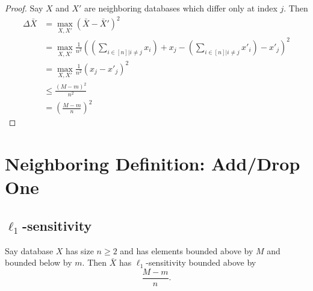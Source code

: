 \documentclass[11pt]{scrartcl} %
\begin{document}
\begin{proof}
	Say $X$ and $X'$ are neighboring databases which differ only at index $j$. Then
	\begin{align*}
		\Delta{\bar{X}} &= \max_{X,X'} (\bar{X} - \bar{X}')^2 \\
						&= \max_{X,X'} \frac{1}{n^2} \left(
								\left( \sum_{i \in [n] | i \neq j} x_i \right) + x_j -
								\left( \sum_{i \in [n] | i \neq j} x'_i \right) - x'_j
							\right)^2 \\
						&= \max_{X,X'} \frac{1}{n^2} (x_j - x'_j)^2 \\
						&\leq \frac{(M-m)^2}{n^2} \\
						&= \left( \frac{M-m}{n} \right)^2
	\end{align*}
\end{proof}

\section{Neighboring Definition: Add/Drop One}
\subsection{$\ell_1$-sensitivity}

\begin{theorem}
Say database $X$ has size $n \geq 2$ and has elements bounded above by $M$ and bounded below by $m$. Then $\bar{X}$ has $\ell_1$-sensitivity bounded above by
$$ \frac{M-m}{n}. $$
\end{theorem}

\end{document}
